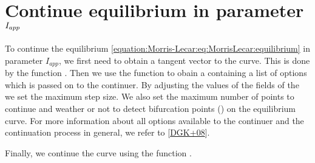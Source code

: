 \documentclass[letterpaper,10pt,english]{jupyterBook}
\begin{document}
\section{Continue equilibrium in parameter \protect\(I_{app}\protect\)}
\label{\detokenize{Morris-Lecar:continue-equilibrium-in-parameter-i-app}}
\sphinxAtStartPar
To continue the equilibrium \eqref{equation:Morris-Lecar:eq:MorrisLecar:equilibrium} in parameter
\(I_{app}\), we first need to obtain a tangent vector to the curve. This is done
by the function . Then we use the function  to obain a
 containing a list of options which is passed on to the continuer. By
adjusting the values of the fields of the   we set the maximum
step size.  We also set the maximum number of points to continue and weather or
not to detect bifurcation points () on the equilibrium
curve. For more information about all options available to the
 continuer and the continuation process in general, we refer to
{[}\hyperlink{cite.references:id14}{DGK+08}{]}.

\sphinxAtStartPar
Finally, we continue the curve using the function .

\begin{sphinxVerbatim}[commandchars=\\\{\}]
\PYG{p}{[}\PYG{p}{]}
\PYG{p}{[}\PYG{p}{]}
\end{sphinxVerbatim}
\end{document}
